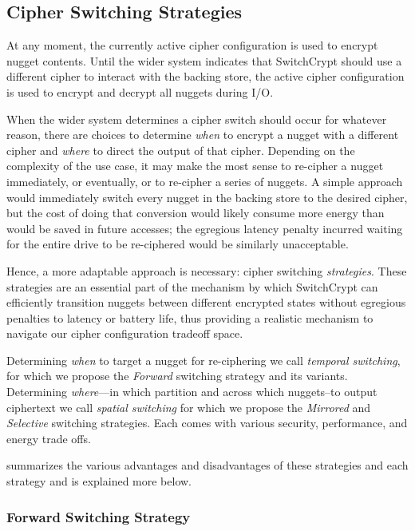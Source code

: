 \subsection{Cipher Switching Strategies}

At any moment, the currently active cipher configuration is used to encrypt
nugget contents. Until the wider system indicates that SwitchCrypt should use a
different cipher to interact with the backing store, the active cipher
configuration is used to encrypt and decrypt all nuggets during I/O.

When the wider system determines a cipher switch should occur for whatever
reason, there are choices to determine \emph{when} to encrypt a nugget
with a different cipher and \emph{where} to direct the output of that cipher.
Depending on the complexity of the use case, it may make the most sense to
re-cipher a nugget immediately, or eventually, or to re-cipher a series of
nuggets. A simple approach would immediately switch every nugget in the backing
store to the desired cipher, but the cost of doing that conversion would likely
consume more energy than would be saved in future accesses; the egregious
latency penalty incurred waiting for the entire drive to be re-ciphered would be
similarly unacceptable.

Hence, a more adaptable approach is necessary: cipher switching
\emph{strategies}. These strategies are an essential part of the mechanism by
which SwitchCrypt can efficiently transition nuggets between different encrypted
states without egregious penalties to latency or battery life, thus providing a
realistic mechanism to navigate our cipher configuration tradeoff space.

Determining \emph{when} to target a nugget for re-ciphering we call
\emph{temporal switching}, for which we propose the \emph{Forward} switching
strategy and its variants. Determining \emph{where}---in which partition and
across which nuggets--to output ciphertext we call \emph{spatial switching} for
which we propose the \emph{Mirrored} and \emph{Selective} switching strategies.
Each comes with various security, performance, and energy trade offs.

 summarizes the various advantages and
disadvantages of these strategies and each strategy and is explained more below.

\subsubsection{Forward Switching Strategy}

